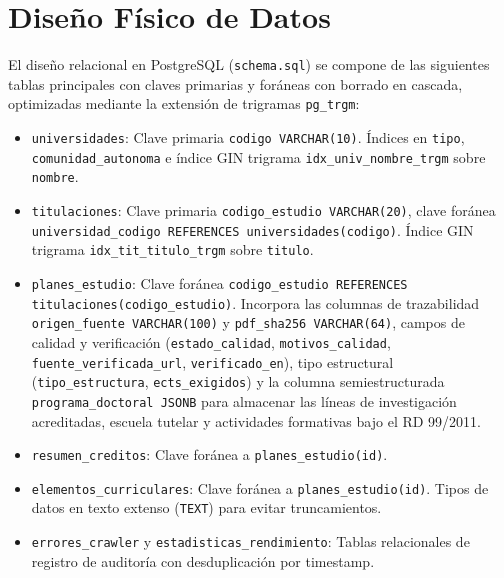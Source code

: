 \section{Diseño Físico de Datos}
El diseño relacional en PostgreSQL (\texttt{schema.sql}) se compone de las siguientes tablas principales con claves primarias y foráneas con borrado en cascada, optimizadas mediante la extensión de trigramas \texttt{pg\_trgm}:
\begin{itemize}
    \item \texttt{universidades}: Clave primaria \texttt{codigo VARCHAR(10)}. Índices en \texttt{tipo}, \texttt{comunidad\_autonoma} e índice GIN trigrama \texttt{idx\_univ\_nombre\_trgm} sobre \texttt{nombre}.
    \item \texttt{titulaciones}: Clave primaria \texttt{codigo\_estudio VARCHAR(20)}, clave foránea \texttt{universidad\_codigo REFERENCES universidades(codigo)}. Índice GIN trigrama \texttt{idx\_tit\_titulo\_trgm} sobre \texttt{titulo}.
    \item \texttt{planes\_estudio}: Clave foránea \texttt{codigo\_estudio REFERENCES titulaciones(codigo\_estudio)}. Incorpora las columnas de trazabilidad \texttt{origen\_fuente VARCHAR(100)} y \texttt{pdf\_sha256 VARCHAR(64)}, campos de calidad y verificación (\texttt{estado\_calidad}, \texttt{motivos\_calidad}, \texttt{fuente\_verificada\_url}, \texttt{verificado\_en}), tipo estructural (\texttt{tipo\_estructura}, \texttt{ects\_exigidos}) y la columna semiestructurada \texttt{programa\_doctoral JSONB} para almacenar las líneas de investigación acreditadas, escuela tutelar y actividades formativas bajo el RD 99/2011.
    \item \texttt{resumen\_creditos}: Clave foránea a \texttt{planes\_estudio(id)}.
    \item \texttt{elementos\_curriculares}: Clave foránea a \texttt{planes\_estudio(id)}. Tipos de datos en texto extenso (\texttt{TEXT}) para evitar truncamientos.
    \item \texttt{errores\_crawler} y \texttt{estadisticas\_rendimiento}: Tablas relacionales de registro de auditoría con desduplicación por timestamp.
\end{itemize}

